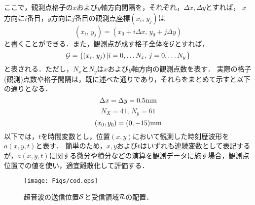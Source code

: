 ここで，観測点格子の$x$および$y$軸方向間隔を，それぞれ，$\Delta x,\Delta y$とすれば，
$x$方向に$i$番目，$y$方向に$j$番目の観測点座標$(x_i,\, y_j)$は
\begin{equation}
	(x_i,\, y_j)=(x_0+i\Delta x,\, y_0+j\Delta y)
	\label{eqn:x_ij}
\end{equation}
と書くことができる．また，観測点が成す格子全体を${\cal G}$とすれば，
\begin{equation}
	{\cal G} = \left\{ 
	(x_i,\, y_j)\left| i=0,\dots N_x, \, j=0,\dots N_y  \right.
	\right\}
	\label{eqn:Grid}
\end{equation}
と表される．ただし，$N_x$と$N_y$は$x$および$y$軸方向の観測点数を表す．
実際の格子(観測)点数や格子間隔は，既に述べた通りであり，それらをまとめて示すと以下の通りとなる．
\begin{equation}
	\Delta x=\Delta y=0.5 {\rm mm}
	\label{eqn:grid_prms}
\end{equation}
\begin{equation}
	N_X=41, \, N_y=61
	\label{eqn:grid_nums}
\end{equation}
\begin{equation}
	(x_0,y_0)=(0,-15){\rm mm}
	\label{eqn:grid_corner}
\end{equation}
以下では，$t$を時間変数とし，位置$(x,y)$において観測した時刻歴波形を$a(x,y,t)$と表す．
簡単のため，$x,y$および$t$はいずれも連続変数として表記するが，$a(x,y,t)$に関する微分や積分などの演算を観測データに施す場合，観測点位置での値を使い，適宜離散化して評価する．
\begin{figure}[t]
\begin{center}
\texttt{[image: Figs/cod.eps]}
\caption{
	超音波の送信位置$\cal S$と受信領域$\cal R$の配置．
}
\label{fig:fig4}
\end{center}
\end{figure}
